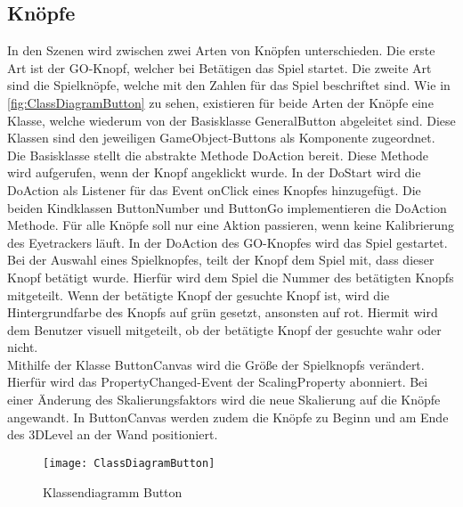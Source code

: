 \subsection{Knöpfe}
In den Szenen wird zwischen zwei Arten von Knöpfen unterschieden. Die erste Art ist der GO-Knopf, welcher bei Betätigen das Spiel startet. Die zweite Art sind die Spielknöpfe, welche mit den Zahlen für das Spiel beschriftet sind. Wie in \autoref{fig:ClassDiagramButton} zu sehen, existieren für beide Arten der Knöpfe eine Klasse, welche wiederum von der Basisklasse {\ttfamily GeneralButton} abgeleitet sind. Diese Klassen sind den jeweiligen GameObject-Buttons als Komponente zugeordnet. Die Basisklasse stellt die abstrakte Methode DoAction bereit. Diese Methode wird aufgerufen, wenn der Knopf angeklickt wurde. In der DoStart wird die DoAction als Listener für das Event onClick eines Knopfes hinzugefügt. Die beiden Kindklassen ButtonNumber und ButtonGo implementieren die DoAction Methode. Für alle Knöpfe soll nur eine Aktion passieren, wenn keine Kalibrierung des Eyetrackers läuft. In der DoAction des GO-Knopfes wird das Spiel gestartet. Bei der Auswahl eines Spielknopfes, teilt der Knopf dem Spiel mit, dass dieser Knopf betätigt wurde. Hierfür wird dem Spiel die Nummer des betätigten Knopfs mitgeteilt. Wenn der betätigte Knopf der gesuchte Knopf ist, wird die Hintergrundfarbe des Knopfs auf grün gesetzt, ansonsten auf rot. Hiermit wird dem Benutzer visuell mitgeteilt, ob der betätigte Knopf der gesuchte wahr oder nicht. \\
Mithilfe der Klasse {\ttfamily ButtonCanvas} wird die Größe der Spielknopfs verändert. Hierfür wird das PropertyChanged-Event der ScalingProperty abonniert. Bei einer Änderung des Skalierungsfaktors wird die neue Skalierung auf die Knöpfe angewandt. In ButtonCanvas werden zudem die Knöpfe zu Beginn und am Ende des 3DLevel an der Wand positioniert. 

\begin{figure}[!htbp]
	\centering
	\texttt{[image: ClassDiagramButton]}
	\caption[Klassendiagramm Button]{Klassendiagramm Button}
	\label{fig:ClassDiagramButton}
\end{figure}

